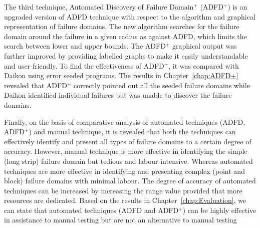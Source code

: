 The third technique, Automated Discovery of Failure Domain$^+$ (ADFD$^+$) is an upgraded version of ADFD technique with respect to the algorithm and graphical representation of failure domains. The new algorithm searches for the failure domain around the failure in a given radius as against ADFD, which limits the search between lower and upper bounds. The ADFD$^+$ graphical output was further improved by providing labelled graphs to make it easily understandable and user-friendly. To find the effectiveness of ADFD$^+$, it was compared with Daikon using error seeded programs. The results in Chapter~\ref{chap:ADFD+} revealed that ADFD$^+$ correctly pointed out all the seeded failure domains while Daikon identified individual failures but was unable to discover the failure domains. 

Finally, on the basis of comparative analysis of automated techniques (ADFD, ADFD$^+$) and manual technique, it is revealed that both the techniques can effectively identify and present all types of failure domains to a certain degree of accuracy. However, manual technique is more effective in identifying the simple (long strip) failure domain but tedious and labour intensive. Whereas automated techniques are more effective in identifying and presenting complex (point and block) failure domains with minimal labour. The degree of accuracy of automated techniques can be increased by increasing the range value provided that more resources are dedicated. Based on the results in Chapter~\ref{chap:Evaluation}, we can state that automated techniques (ADFD and ADFD$^+$) can be highly effective in assistance to manual testing but are not an alternative to manual testing







